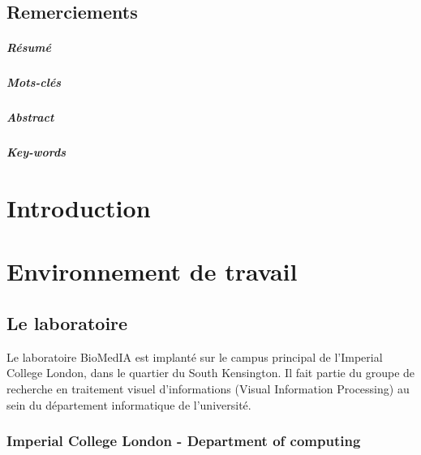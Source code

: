 \documentclass[10pt]{report}
\begin{document}
\section*{Remerciements}\newpage
\paragraph*{Résumé} %
\paragraph*{Mots-clés}
\paragraph*{Abstract}
\paragraph*{Key-words}

\renewcommand\contentsname{Sommaire}
\tableofcontents

\newpage

\chapter*{Introduction}
\chapter{Environnement de travail} 
	\section{Le laboratoire}
		Le laboratoire BioMedIA est implanté sur le campus principal de l'Imperial College London, dans le quartier du South Kensington. Il fait partie du groupe de recherche en traitement visuel d'informations (Visual Information Processing) au sein du département informatique de l'université.
	\subsection{Imperial College London - Department of computing}

	
\end{document}
